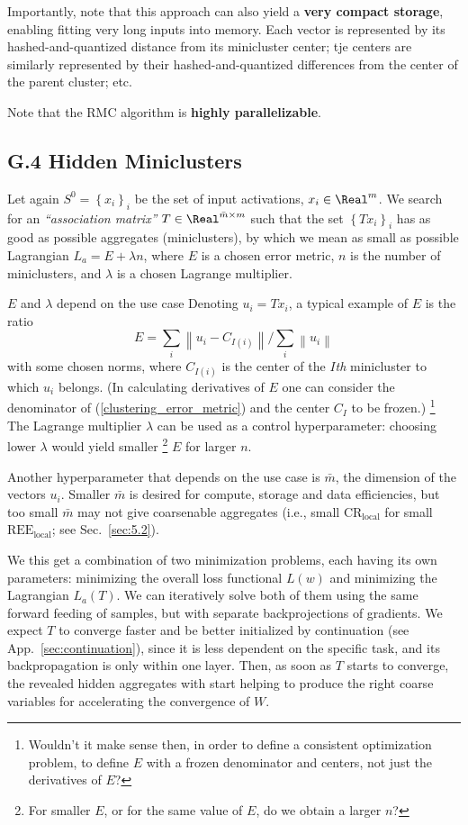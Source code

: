 \documentclass{article} %
\begin{document}
Importantly, note that this approach can also yield a {\bf very compact storage}, enabling fitting very long inputs into memory. Each vector is represented by its hashed-and-quantized distance from its minicluster center; tje centers are similarly represented by their hashed-and-quantized differences from the center of the parent cluster; etc.

Note that the RMC algorithm is {\bf highly parallelizable}.

\subsection{G.4 Hidden Miniclusters}
Let again $S^0 = \left\{x_i\right\}_i$ be the set of input activations, $x_i \in \Real^m$. We search for an {\it ``association matrix''} $T \in \Real^{\bar{m} \times m}$ such that the set $\left\{T x_i\right\}_i$ has as good as possible aggregates (miniclusters), by which we mean as small as possible Lagrangian $L_a = E + \lambda n$, where $E$ is a chosen error metric, $n$ is the number of miniclusters, and $\lambda$ is a chosen Lagrange multiplier.

$E$ and $\lambda$ depend on the use case Denoting $u_i = T x_i$, a typical example of $E$ is the ratio
\begin{equation}
    E = \sum_i \left\| u_i - C_{I(i)} \right\| / \sum_i \left\| u_i \right\|
    \label{clustering_error_metric}
\end{equation}
with some chosen norms, where $C_{I(i)}$ is the center of the $I${\it th} minicluster to which $u_i$ belongs. (In calculating derivatives of $E$ one can consider the denominator of (\ref{clustering_error_metric}) and the center $C_I$ to be frozen.) \footnote{Wouldn't it make sense then, in order to define a consistent optimization problem, to define $E$ with a frozen denominator and centers, not just the derivatives of $E$?} The Lagrange multiplier $\lambda$ can be used as a control hyperparameter: choosing lower $\lambda$ would yield smaller \footnote{For smaller $E$, or for the same value of $E$, do we obtain a larger $n$?} $E$ for larger $n$.

Another hyperparameter that depends on the use case is $\bar{m}$, the dimension of the vectors $u_i$. Smaller $\bar{m}$ is desired for compute, storage and data efficiencies, but too small $\bar{m}$ may not give coarsenable aggregates (i.e., small $\text{CR}_{\text{local}}$ for small $\text{REE}_{\text{local}}$; see Sec.~\ref{sec:5.2}).

We this get a combination of two minimization problems, each having its own parameters: minimizing the overall loss functional $L(w)$ and minimizing the Lagrangian $L_a(T)$. We can iteratively solve both of them using the same forward feeding of samples, but with separate backprojections of gradients. We expect $T$ to converge faster and be better initialized by continuation (see App.~\ref{sec:continuation}), since it is less dependent on the specific task, and its backpropagation is only within one layer. Then, as soon as $T$ starts to converge, the revealed hidden aggregates with start helping to produce the right coarse variables for accelerating the convergence of $W$.
\end{document}

